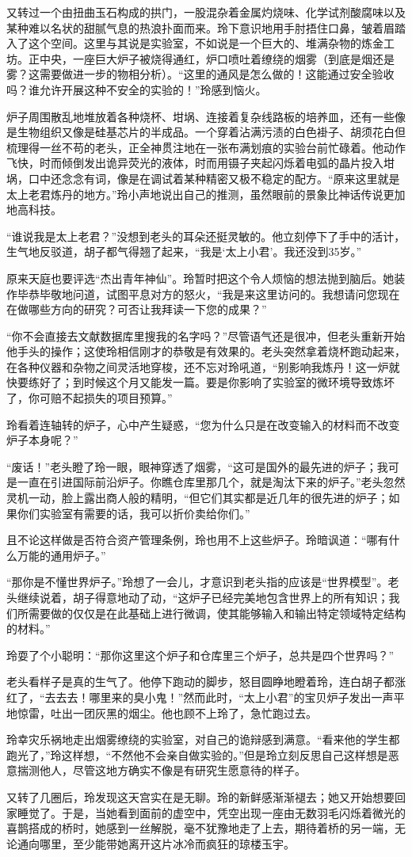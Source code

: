 又转过一个由扭曲玉石构成的拱门，一股混杂着金属灼烧味、化学试剂酸腐味以及某种难以名状的甜腻气息的热浪扑面而来。玲下意识地用手肘捂住口鼻，皱着眉踏入了这个空间。这里与其说是实验室，不如说是一个巨大的、堆满杂物的炼金工坊。正中央，一座巨大炉子被烧得通红，炉口喷吐着缭绕的烟雾（到底是烟还是雾？这需要做进一步的物相分析）。“这里的通风是怎么做的！这能通过安全验收吗？谁允许开展这种不安全的实验的！”玲感到恼火。

炉子周围散乱地堆放着各种烧杯、坩埚、连接着复杂线路板的培养皿，还有一些像是生物组织又像是硅基芯片的半成品。一个穿着沾满污渍的白色褂子、胡须花白但梳理得一丝不苟的老头，正全神贯注地在一张布满划痕的实验台前忙碌着。他动作飞快，时而倾倒发出诡异荧光的液体，时而用镊子夹起闪烁着电弧的晶片投入坩埚，口中还念念有词，像是在调试着某种精密又极不稳定的配方。“原来这里就是太上老君炼丹的地方。”玲小声地说出自己的推测，虽然眼前的景象比神话传说更加地高科技。

“谁说我是太上老君？”没想到老头的耳朵还挺灵敏的。他立刻停下了手中的活计，生气地反驳道，胡子都气得翘了起来，“我是‘太上小君’。我还没到35岁。”

原来天庭也要评选“杰出青年神仙”。玲暂时把这个令人烦恼的想法抛到脑后。她装作毕恭毕敬地问道，试图平息对方的怒火，“我是来这里访问的。我想请问您现在在做哪些方向的研究？可否让我拜读一下您的成果？”

“你不会直接去文献数据库里搜我的名字吗？”尽管语气还是很冲，但老头重新开始他手头的操作；这使玲相信刚才的恭敬是有效果的。老头突然拿着烧杯跑动起来，在各种仪器和杂物之间灵活地穿梭，还不忘对玲吼道，“别影响我炼丹！这一炉就快要练好了；到时候这个月又能发一篇。要是你影响了实验室的微环境导致炼坏了，你可赔不起损失的项目预算。”

玲看着连轴转的炉子，心中产生疑惑，“您为什么只是在改变输入的材料而不改变炉子本身呢？”

“废话！”老头瞪了玲一眼，眼神穿透了烟雾，“这可是国外的最先进的炉子；我可是一直在引进国际前沿炉子。你瞧仓库里那几个，就是淘汰下来的炉子。”老头忽然灵机一动，脸上露出商人般的精明，“但它们其实都是近几年的很先进的炉子；如果你们实验室有需要的话，我可以折价卖给你们。”

且不论这样做是否符合资产管理条例，玲也用不上这些炉子。玲暗讽道：“哪有什么万能的通用炉子。”

“那你是不懂世界炉子。”玲想了一会儿，才意识到老头指的应该是“世界模型”。老头继续说着，胡子得意地动了动，“这炉子已经完美地包含世界上的所有知识；我们所需要做的仅仅是在此基础上进行微调，使其能够输入和输出特定领域特定结构的材料。”

玲耍了个小聪明：“那你这里这个炉子和仓库里三个炉子，总共是四个世界吗？”

老头看样子是真的生气了。他停下跑动的脚步，怒目圆睁地瞪着玲，连白胡子都涨红了，“去去去！哪里来的臭小鬼！”然而此时，“太上小君”的宝贝炉子发出一声平地惊雷，吐出一团灰黑的烟尘。他也顾不上玲了，急忙跑过去。

玲幸灾乐祸地走出烟雾缭绕的实验室，对自己的诡辩感到满意。“看来他的学生都跑光了，”玲这样想，“不然他不会亲自做实验的。”但是玲立刻反思自己这样想是恶意揣测他人，尽管这地方确实不像是有研究生愿意待的样子。

又转了几圈后，玲发现这天宫实在是无聊。玲的新鲜感渐渐褪去；她又开始想要回家睡觉了。于是，当她看到面前的虚空中，凭空出现一座由无数羽毛闪烁着微光的喜鹊搭成的桥时，她感到一丝解脱，毫不犹豫地走了上去，期待着桥的另一端，无论通向哪里，至少能带她离开这片冰冷而疯狂的琼楼玉宇。
